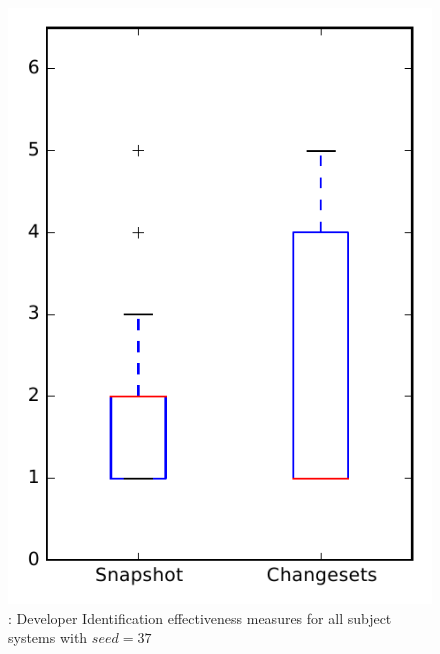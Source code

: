 
\begin{figure}
\centering
\includegraphics[height=0.4\textheight]{figures/dit_seed/rq1_overview_37}
\caption{\rtwo: Developer Identification effectiveness measures for all subject systems with $seed=37$}
\label{fig:dit_seed:rq1:overview}
\end{figure}
